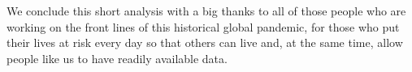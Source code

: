 \documentclass[11pt,a4paper,final]{paper}
\begin{document}
 We conclude this short analysis with a big thanks to all of those people who are working on the front lines of this historical global pandemic, for those who put their lives at risk every day so that others can live and, at the same time, allow people like us to have readily available data.




\clearpage

\end{document}
